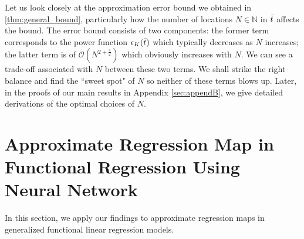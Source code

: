 \documentclass{article}
\def\NN{\mathbb N}
\numberwithin{equation}{section}
\begin{document}
Let us look closely at the approximation error bound we obtained in \eqref{thm:general_bound}, particularly how the number of locations $N\in \NN$ in $\Bar{t}$ affects the bound. 
The error bound consists of two components: the former term corresponds to the power function $\epsilon_K(\Bar{t})$ which typically decreases as $N$ increases; the latter term is of $\mathcal{O}(N^{2+\frac{s}{2}})$ which obviously increases with $N$. 
We can see a trade-off associated with $N$ between these two terms. 
We shall strike the right balance and find the ``sweet spot" of $N$ so neither of these terms blows up. 
Later, in the proofs of our main results in Appendix \ref{sec:appendB}, we give detailed derivations of the optimal choices of $N$.  


\section{Approximate
 Regression Map in Functional Regression Using Neural Network}\label{sec: regression}
In this section, we apply our findings to approximate regression maps in generalized functional linear regression models. 
\end{document}
